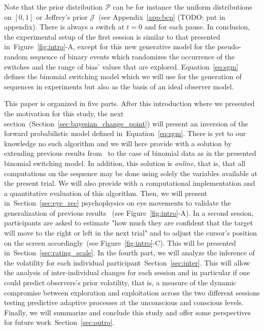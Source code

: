 \documentclass[profile,final,english, draft]{article}%
\newcommand{\Jj}{\mathcal{J}}
\newcommand{\Pp}{\mathcal{P}}
\newcommand{\citet}[1]{\textcite{#1}}
\newcommand{\seeFig}[1]{Figure~\ref{fig:#1}}
\newcommand{\seeEq}[1]{Equation~\ref{eq:#1}}
\newcommand{\seeApp}[1]{Appendix~\ref{app:#1}}
\newcommand{\seeSec}[1]{Section~\ref{sec:#1}}
\begin{document}
Note that the prior distribution $\Pp$ can be for instance
the uniform distributions on $ [ 0, 1 ] $ or
Jeffrey's prior $\Jj$~(see \seeApp{bcp} (TODO: put in appendix).
There is always a switch at $t=0$ and for each pause.
In conclusion, the experimental setup of the first session
is similar to that presented in~\seeFig{intro}-A, except for
this new generative model for the pseudo-random sequence of binary events
which randomizes the occurrence of the switches
and the range of bias' values that are explored.
\seeEq{sgm} defines the binomial switching model which we will use
for the generation of sequences in experiments
but also as the basis of an ideal observer model.

This paper is organized in five parts.
After this introduction where we presented the motivation for this study,
the next section~(\seeSec{bayesian_change_point}) will present
an inversion of the forward probabilistic model defined in~\seeEq{sgm}.
There is yet to our knowledge no such algorithm and
we will here provide with a solution
by extending previous results from~\citet{AdamsMackay2007}
to the case of binomial data as in the presented binomial switching model.
In addition, this solution is \emph{online},
that is, that all computations on the sequence may be done 
using solely the variables available at the present trial.
We will also provide with a computational implementation
and a quantitative evaluation of this algorithm.
Then, we will present in~\seeSec{eye_rec} psychophysics on eye movements
to validate the generalization of previous results%
~(see \seeFig{intro}-A).
In a second session, participants are asked to estimate
"how much they are confident that
the target will move to the right or left in the next trial" and
to adjust the cursor's position on the screen accordingly~(see \seeFig{intro}-C).
This will be presented in~\seeSec{rating_scale}.
In the fourth part, we will analyze the inference of the volatility
for each individual participant~\seeSec{inter}.
This will allow the analysis of inter-individual changes for each session
and in particular if one could predict observers's prior volatility,
that is, a measure of the dynamic compromise between exploration and exploitation
across the two different sessions testing predictive adaptive processes
at the unconscious and conscious levels.
Finally, we will summarize and conclude this study and
offer some perspectives for future work~\seeSec{outro}.
\end{document}
